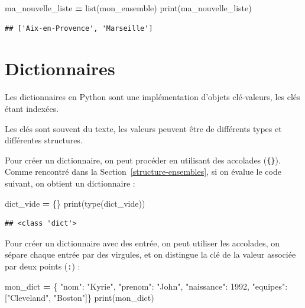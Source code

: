 \documentclass[12pt,]{book}
\newenvironment{Shaded}{\begin{snugshade}}{\end{snugshade}}
\newcommand{\DecValTok}[1]{\textcolor[rgb]{0.00,0.00,0.81}{#1}}
\newcommand{\StringTok}[1]{\textcolor[rgb]{0.31,0.60,0.02}{#1}}
\newcommand{\OperatorTok}[1]{\textcolor[rgb]{0.81,0.36,0.00}{\textbf{#1}}}
\newcommand{\BuiltInTok}[1]{#1}
\newcommand{\NormalTok}[1]{#1}
\numberwithin{equation}{section}
\numberwithin{countremarque}{section}
\begin{document}
\begin{Shaded}
\begin{Highlighting}[]
\NormalTok{ma_nouvelle_liste }\OperatorTok{=} \BuiltInTok{list}\NormalTok{(mon_ensemble)}
\BuiltInTok{print}\NormalTok{(ma_nouvelle_liste)}
\end{Highlighting}
\end{Shaded}

\begin{lstlisting}
## ['Aix-en-Provence', 'Marseille']
\end{lstlisting}

\section{Dictionnaires}\label{type-dict}

Les dictionnaires en Python sont une implémentation d'objets
clé-valeurs, les clés étant indexées.

Les clés sont souvent du texte, les valeurs peuvent être de différents
types et différentes structures.

Pour créer un dictionnaire, on peut procéder en utilisant des accolades
(\texttt{\{\}}). Comme rencontré dans la
Section~\ref{structure-ensembles}, si on évalue le code suivant, on
obtient un dictionnaire :

\begin{Shaded}
\begin{Highlighting}[]
\NormalTok{dict_vide }\OperatorTok{=}\NormalTok{ \{\}}
\BuiltInTok{print}\NormalTok{(}\BuiltInTok{type}\NormalTok{(dict_vide))}
\end{Highlighting}
\end{Shaded}

\begin{lstlisting}
## <class 'dict'>
\end{lstlisting}

Pour créer un dictionnaire avec des entrée, on peut utiliser les
accolades, on sépare chaque entrée par des virgules, et on distingue la
clé de la valeur associée par deux points (\texttt{:}) :

\begin{Shaded}
\begin{Highlighting}[]
\NormalTok{mon_dict }\OperatorTok{=}\NormalTok{ \{ }\StringTok{"nom"}\NormalTok{: }\StringTok{"Kyrie"}\NormalTok{,}
  \StringTok{"prenom"}\NormalTok{: }\StringTok{"John"}\NormalTok{,}
  \StringTok{"naissance"}\NormalTok{: }\DecValTok{1992}\NormalTok{,}
  \StringTok{"equipes"}\NormalTok{: [}\StringTok{"Cleveland"}\NormalTok{, }\StringTok{"Boston"}\NormalTok{]\}}
\BuiltInTok{print}\NormalTok{(mon_dict)}
\end{Highlighting}
\end{Shaded}
\end{document}
